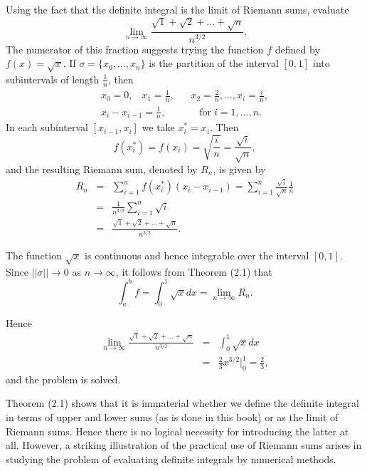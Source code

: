 \begin{example} Using the fact that the definite integral is the limit of Riemann sums, evaluate
$$
\lim_{n \rightarrow \infty} \frac{\sqrt 1 + \sqrt 2 + ... + \sqrt n}{n^{3/2}}.
$$
\noindent The numerator of this fraction suggests trying the function $f$ defined by $f(x) = \sqrt x$. If $ \sigma = \{ x_0, . . ., x_n \}$ is the partition of the interval $[0, 1]$ into subintervals of length $\frac{1}{n}$, then 
$$
\begin{array}{rl}
x_0 = 0, \;\;\; x_1 = \frac{1}{n},\;\;\;& x_2 = \frac{2}{n}, ... , x_i = \frac{i}{n},\\
x_i - x_{i-1} = \frac{1}{n},\;\;\;& \;\;\;\mbox{for}\; i = 1, ... , n.
\end{array}
$$
\noindent In each subinterval $[x_{i-1}, x_i]$ we take $x_{i}^{*} = x_i$. Then 
$$
f(x_i^{*}) = f(x_i) = \sqrt {\frac{i}{n}} = \frac{\sqrt i}{\sqrt n},
$$
\noindent and the resulting Riemann sum, denoted by $R_n$, is given by 
\begin{eqnarray*}
R_n &=& \sum_{i = 1}^{n} f(x_{i}^{*})(x_i - x_{i-1}) = \sum_{i = 1}^{n} \frac{\sqrt i}{\sqrt n} \frac{1}{n} \\
       &=& \frac{1}{n^{3/2}} \sum_{i = 1}^{n} \sqrt i \\
       &=& \frac{\sqrt 1 + \sqrt 2 + ... + \sqrt n}{n^{3/2}} .
\end{eqnarray*}

\noindent The function $\sqrt x$ is continuous and hence integrable over the interval $[0, 1]$. Since $|| \sigma || \rightarrow 0$ as $n \rightarrow \infty$, it follows from Theorem (2.1) that
$$
\int_a^b f = \int_0^1 \sqrt x dx = \lim_{n \rightarrow \infty} R_n.
$$

\noindent Hence
\begin{eqnarray*}
\lim_{n \rightarrow \infty} \frac{\sqrt 1 + \sqrt 2 + ... + \sqrt n}{n^{3/2}} 
&=& \int_0^1 \sqrt x dx \\
&=& \frac{2}{3} x^{3/2} \Big|_0^1 = \frac{2}{3}, 
\end{eqnarray*}
\noindent and the problem is solved.
\end{example}

Theorem (2.1) shows that it is immaterial whether we define the definite integral in terms of upper and lower sums (as is done in this book) or as the limit of Riemann sums. Hence there is no logical necessity for introducing the latter at all. However, a striking illustration of the practical use of Riemann sums arises in studying the problem of evaluating definite integrals by numerical methods.

